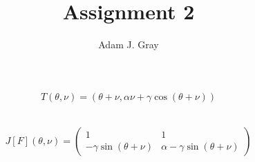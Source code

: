 \documentclass{unswmaths}
\begin{document}
\author{Adam J. Gray}
\title{Assignment 2}
\subject{Ergodic Theory}

\unswtitle

\section{}
\subsection{}
\begin{align*}
    T(\theta, \nu) = (\theta + \nu, \alpha\nu + \gamma \cos(\theta + \nu))
\end{align*}
\subsection{}
\begin{align*}
    J[F](\theta, \nu) = \left( 
    \begin{array}{cc}
        1   & 1 \\
        -\gamma \sin(\theta + \nu) & \alpha - \gamma\sin(\theta + \nu)
    \end{array}
    \right)
\end{align*}
\end{document}
